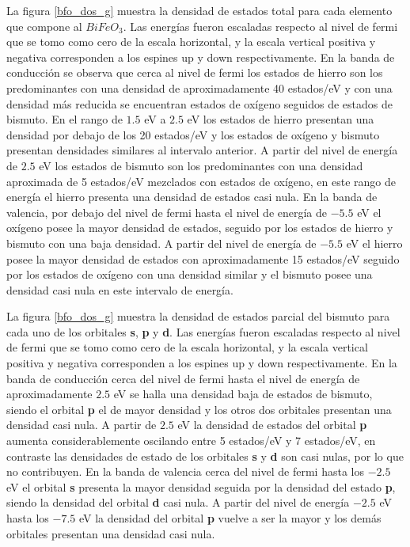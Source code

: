 \noindent La figura \ref{bfo_dos_g}  muestra la densidad de 
estados total para 
cada elemento que compone al $BiFeO_{3}$. Las energ\'ias fueron 
escaladas respecto al 
nivel de fermi que se tomo como cero de la escala horizontal, y la 
escala 
vertical positiva y negativa corresponden a los espines up y down 
respectivamente. En la banda de conducci\'on se observa que cerca al 
nivel de fermi los estados de hierro son los predominantes con una 
densidad de aproximadamente 40 estados/eV y con una densidad m\'as 
reducida se encuentran estados de ox\'igeno seguidos de estados de 
bismuto. En el rango de $1.5$ eV a $2.5$ eV los estados de hierro 
presentan una densidad por debajo de los 20 estados/eV y los estados 
de ox\'igeno y bismuto presentan densidades similares al intervalo 
anterior. A partir del nivel de energ\'ia de $2.5$ eV los estados de 
bismuto son los predominantes con una densidad aproximada de 5 
estados/eV mezclados con estados de ox\'igeno, en este rango de 
energ\'ia el hierro presenta una densidad de estados casi nula. En la 
banda de valencia, por debajo del nivel de fermi hasta el nivel de 
energ\'ia de $-5.5$ eV el ox\'igeno posee la mayor densidad de estados, 
seguido por los estados de hierro y bismuto con una baja densidad. 
A partir del nivel de energ\'ia de $-5.5$ eV el hierro posee la mayor 
densidad de estados con aproximadamente 15 estados/eV seguido por los 
estados de ox\'igeno con una densidad similar y el bismuto posee una 
densidad casi nula en este intervalo de energ\'ia.



\noindent La figura \ref{bfo_dos_g}  muestra la densidad de 
estados parcial del 
bismuto 
para cada uno de los orbitales \textbf{s}, \textbf{p} y \textbf{d}. 
Las 
energ\'ias fueron escaladas respecto al 
nivel de fermi que se tomo como cero de la escala horizontal, y la 
escala 
vertical positiva y negativa corresponden a los espines up y down 
respectivamente. En la banda de conducci\'on cerca del nivel de fermi 
hasta el nivel de energ\'ia de aproximadamente $2.5$ eV se halla una 
densidad baja de estados de bismuto, siendo el orbital \textbf{p} el 
de mayor densidad y los otros dos orbitales presentan una densidad 
casi nula. A partir de $2.5$ eV la densidad de estados del orbital 
\textbf{p} aumenta considerablemente oscilando entre 5 estados/eV y 7 
estados/eV, en contraste las densidades de estado de los orbitales 
\textbf{s} y \textbf{d} son casi nulas, por lo que no contribuyen. En 
la banda de valencia cerca del nivel de fermi hasta los $-2.5$ eV el 
orbital \textbf{s} presenta la mayor densidad seguida por la densidad 
del estado \textbf{p}, siendo la densidad del orbital \textbf{d} casi 
nula. A partir del nivel de energ\'ia $-2.5$ eV hasta los $-7.5$ eV la 
densidad del orbital \textbf{p} vuelve a ser la mayor y los dem\'as 
orbitales presentan una densidad casi nula.

